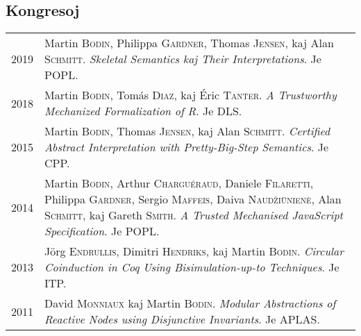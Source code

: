 \documentclass[12pt,a4paper]{article}
\makeatletter
\newenvironment{datecvsection}[1]%
               {\subsection*{#1}%
                 \noindent \begin{tabular}{@{}p{\annee}p{\texte}@{}}}
               {\end{tabular}}
\makeatother
\begin{document}
\begin{datecvsection}{Kongresoj}

  2019 & Martin \textsc{Bodin}, Philippa \textsc{Gardner}, Thomas \textsc{Jensen}, kaj Alan \textsc{Schmitt}. \textit{Skeletal Semantics kaj Their Interpretations}. Je POPL. \\

  2018 & Martin \textsc{Bodin}, Tomás \textsc{Diaz}, kaj Éric \textsc{Tanter}. \textit{A Trustworthy Mechanized Formalization of R}. Je DLS. \\

  2015 & Martin \textsc{Bodin}, Thomas \textsc{Jensen}, kaj Alan \textsc{Schmitt}. \textit{Certified Abstract Interpretation with Pretty-Big-Step Semantics}. Je CPP. \\

  2014 & Martin \textsc{Bodin}, Arthur \textsc{Charguéraud}, Daniele \textsc{Filaretti}, Philippa \textsc{Gardner}, Sergio \textsc{Maffeis}, Daiva \textsc{Naudžiūnienė}, Alan \textsc{Schmitt}, kaj Gareth \textsc{Smith}. \textit{A Trusted Mechanised JavaScript Specification}. Je POPL. \\

  2013 & Jörg \textsc{Endrullis}, Dimitri \textsc{Hendriks}, kaj Martin \textsc{Bodin}. \textit{Circular Coinduction in Coq Using Bisimulation-up-to Techniques}. Je ITP. \\

  2011 & David \textsc{Monniaux} kaj Martin \textsc{Bodin}. \textit{Modular Abstractions of Reactive Nodes using Disjunctive Invariants}. Je APLAS. \\

\end{datecvsection}
\end{document}
